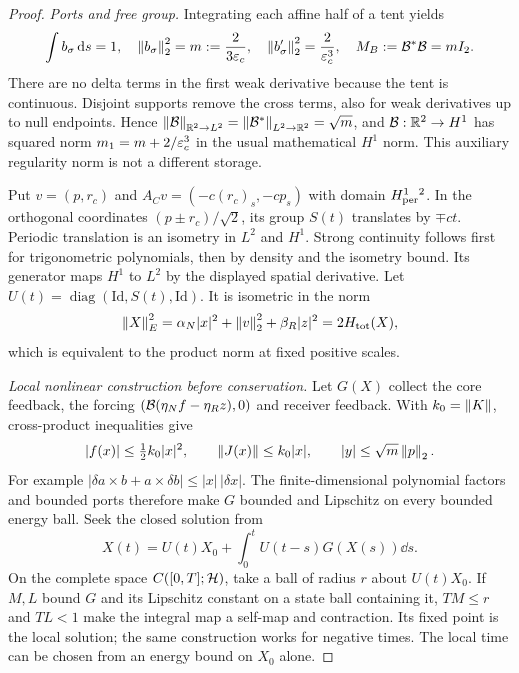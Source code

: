 \begin{proof}
\textit{Ports and free group.}
Integrating each affine half of a tent yields
\begin{equation}\label{eq:profilenorms}
 \int b_\sigma\,\mathrm d s=1,\quad
 \left\|b_\sigma\right\|_2^2=m:=\frac2{3\varepsilon_c},\quad
 \left\|b'_\sigma\right\|_2^2=\frac2{\varepsilon_c^3},\quad
 M_B:=\mathcal B^*\mathcal B=mI_2.
\end{equation}
There are no delta terms in the first weak derivative because the tent is continuous. Disjoint supports remove the cross terms, also for weak derivatives up to null endpoints. Hence $\left\|\mathcal B\right\|_{\mathbb R^2\to L^2}=\left\|\mathcal B^*\right\|_{L^2\to\mathbb R^2}=\sqrt m$, and $\mathcal B:\mathbb R^2\to H^1$ has squared norm $m_1=m+2/\varepsilon_c^3$ in the usual mathematical $H^1$ norm. This auxiliary regularity norm is not a different storage.

Put $v=(p,r_c)$ and $A_Cv=(-c(r_c)_s,-cp_s)$ with domain $H^1_{\rm per}{}^2$. In the orthogonal coordinates $(p\pm r_c)/\sqrt2$, its group $S(t)$ translates by $\mp ct$. Periodic translation is an isometry in $L^2$ and $H^1$. Strong continuity follows first for trigonometric polynomials, then by density and the isometry bound. Its generator maps $H^1$ to $L^2$ by the displayed spatial derivative. Let $U(t)=\operatorname{diag}(\mathrm{Id},S(t),\mathrm{Id})$. It is isometric in the norm
\begin{equation}\label{eq:energynorm}
 \left\|X\right\|_E^2=\alpha_N|x|^2+\left\|v\right\|_2^2+\beta_R|z|^2=2H_{\rm tot}(X),
\end{equation}
which is equivalent to the product norm at fixed positive scales.

\textit{Local nonlinear construction before conservation.}
Let $G(X)$ collect the core feedback, the forcing $(\mathcal B(\eta_N f-\eta_Rz),0)$ and receiver feedback. With $k_0=\left\|K\right\|$, cross-product inequalities give
\begin{equation}\label{eq:lipschitzbounds}
 |f(x)|\le\tfrac12 k_0|x|^2,\qquad
 \left\|J(x)\right\|\le k_0|x|,\qquad |y|\le\sqrt m\left\|p\right\|_2.
\end{equation}
For example $|\delta a\times b+a\times\delta b|\le |x|\,|\delta x|$. The finite-dimensional polynomial factors and bounded ports therefore make $G$ bounded and Lipschitz on every bounded energy ball. Seek the closed solution from
\begin{equation}\label{eq:duhamel}
 X(t)=U(t)X_0+\int_0^tU(t-s)G(X(s))\dd s.
\end{equation}
On the complete space $C([0,T];\mathcal H)$, take a ball of radius $r$ about $U(t)X_0$. If $M,L$ bound $G$ and its Lipschitz constant on a state ball containing it, $TM\le r$ and $TL<1$ make the integral map a self-map and contraction. Its fixed point is the local solution; the same construction works for negative times. The local time can be chosen from an energy bound on $X_0$ alone.


\end{proof}
